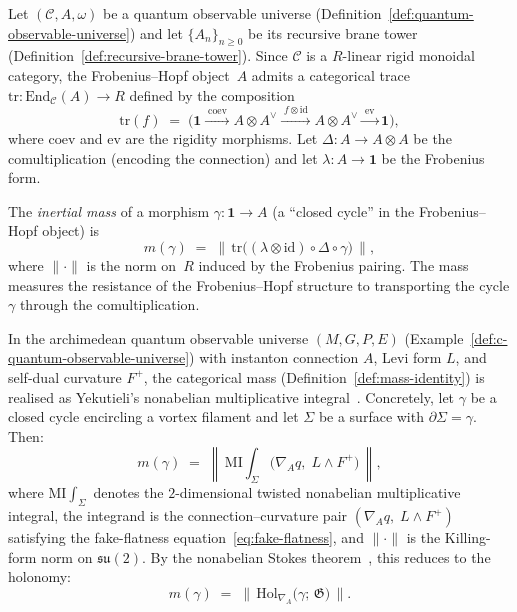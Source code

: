 \begin{definition}
\label{def:mass-identity}
Let $(\mathcal{C}, A, \omega)$ be a quantum observable universe
(Definition~\ref{def:quantum-observable-universe}) and let
$\{A_n\}_{n \geq 0}$ be its recursive brane tower
(Definition~\ref{def:recursive-brane-tower}).  Since $\mathcal{C}$ is a
$R$-linear rigid monoidal category, the Frobenius--Hopf object~$A$
admits a categorical trace
$\mathrm{tr} \colon \mathrm{End}_{\mathcal{C}}(A) \to R$
defined by the composition
\[
  \mathrm{tr}(f)
  \;=\;
  \bigl(\mathbf{1}
  \xrightarrow{\;\mathrm{coev}\;}
  A \otimes A^{\vee}
  \xrightarrow{\;f \otimes \mathrm{id}\;}
  A \otimes A^{\vee}
  \xrightarrow{\;\mathrm{ev}\;}
  \mathbf{1}\bigr),
\]
where $\mathrm{coev}$ and $\mathrm{ev}$ are the rigidity morphisms.
Let $\Delta \colon A \to A \otimes A$ be the comultiplication (encoding
the connection) and let $\lambda \colon A \to \mathbf{1}$ be the
Frobenius form.

The \emph{inertial mass} of a morphism $\gamma \colon \mathbf{1} \to A$
(a ``closed cycle'' in the Frobenius--Hopf object) is
\[
  m(\gamma)
  \;=\;
  \bigl\lVert\,
  \mathrm{tr}\bigl(
    (\lambda \otimes \mathrm{id})
    \circ \Delta
    \circ \gamma
  \bigr)
  \,\bigr\rVert,
\]
where $\lVert \cdot \rVert$ is the norm on~$R$ induced by the
Frobenius pairing.  The mass measures the resistance of the
Frobenius--Hopf structure to transporting the cycle $\gamma$ through
the comultiplication.
\end{definition}

\begin{corollary}
\label{cor:mass-identity-C}
In the archimedean quantum observable universe $(M, G, P, E)$
(Example~\ref{def:c-quantum-observable-universe}) with instanton
connection $A$, Levi form $L$, and self-dual curvature $F^+$, the
categorical mass (Definition~\ref{def:mass-identity}) is realised as
Yekutieli's nonabelian multiplicative integral~\cite{yekutieli2015}.
Concretely, let $\gamma$ be a closed cycle encircling a vortex filament
and let $\Sigma$ be a surface with $\partial\Sigma = \gamma$.  Then:
\[
  m(\gamma) \;=\;
  \left\lVert\,
  \mathrm{MI}\!\!\int_\Sigma
  \bigl(\nabla_A q,\; L \wedge F^+\bigr)
  \,\right\rVert,
\]
where $\mathrm{MI}\!\int_\Sigma$ denotes the $2$-dimensional twisted
nonabelian multiplicative integral, the integrand is the
connection--curvature pair $(\nabla_A q,\; L \wedge F^+)$ satisfying
the fake-flatness equation~\eqref{eq:fake-flatness}, and
$\lVert\cdot\rVert$ is the Killing-form norm on $\mathfrak{su}(2)$.
By the nonabelian Stokes theorem~\cite{yekutieli2015}, this reduces to
the holonomy:
\[
  m(\gamma) \;=\;
  \bigl\lVert\,
  \mathrm{Hol}_{\nabla_A}\!\bigl(\gamma;\, \mathfrak{G}\bigr)
  \,\bigr\rVert.
\]
\end{corollary}

